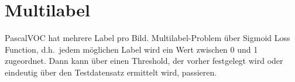 \section{Multilabel}

PascalVOC hat mehrere Label pro Bild.
Multilabel-Problem über Sigmoid Loss Function, d.h.\ jedem möglichen Label wird ein Wert zwischen 0 und 1 zugeordnet.
Dann kann über einen Threshold, der vorher festgelegt wird oder eindeutig über den Testdatensatz ermittelt wird, passieren.
